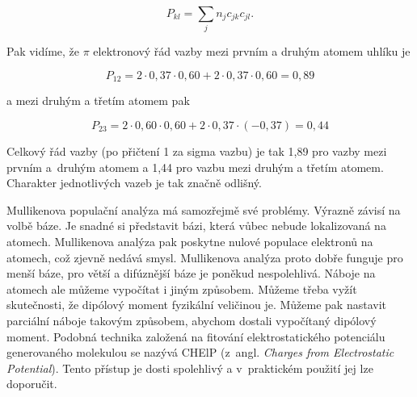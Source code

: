 \begin{priklad}
\begin{equation}
P_{kl} = \sum_j n_j c_{jk} c_{jl}.
\label{rov:Vl-14}
\end{equation}

\noindent Pak vidíme, že $\pi$ elektronový řád vazby mezi prvním a druhým atomem uhlíku je

\begin{equation}
P_{12} = 2 \cdot 0{,}37 \cdot 0{,}60 + 2 \cdot 0{,}37 \cdot 0{,}60 = 0{,}89
\end{equation}

\noindent a mezi druhým a třetím atomem pak

\begin{equation}
P_{23} = 2 \cdot 0{,}60 \cdot 0{,}60 + 2 \cdot 0{,}37 \cdot (-0{,}37) = 0{,}44 \nonumber
\end{equation}


Celkový řád vazby (po přičtení 1 za sigma vazbu) je tak 1,89 pro vazby mezi prvním a~druhým atomem a 1,44 pro vazbu mezi druhým a třetím atomem. Charakter jednotlivých vazeb je tak značně odlišný.
\end{priklad}


Mullikenova populační analýza má samozřejmě své problémy. Výrazně závisí na volbě báze. Je snadné si představit bázi, která vůbec nebude lokalizovaná na atomech. Mullikenova analýza pak poskytne nulové populace elektronů na atomech, což zjevně nedává smysl. Mullikenova analýza proto dobře funguje pro menší báze, pro větší a difúznější báze je poněkud nespolehlivá. Náboje na atomech ale můžeme vypočítat i jiným způsobem. Můžeme třeba vyžít skutečnosti, že dipólový moment fyzikální veličinou je. Můžeme pak nastavit parciální náboje takovým způsobem, abychom dostali vypočítaný dipólový moment. Podobná technika založená na fitování elektrostatického potenciálu generovaného molekulou se nazývá CHElP (z~angl. \textit{Charges from Electrostatic Potential}). Tento přístup je dosti spolehlivý a v~praktickém použití jej lze doporučit.


